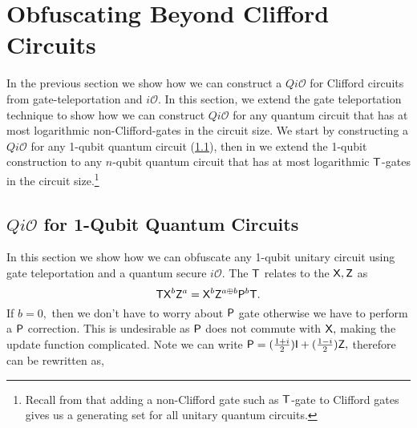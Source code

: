 
\section{Obfuscating Beyond Clifford Circuits}
\label{QiO:Clifford+T:family}
In the previous section we show how we can construct a $Qi\mathcal{O}$ for Clifford circuits from gate-teleportation and $i\mathcal{O}.$ In this section, we extend the gate teleportation technique to show how we can construct $Qi\mathcal{O}$ for any quantum circuit that has at most logarithmic non-Clifford-gates in the circuit size.  We start by constructing a $Qi\mathcal{O}$ for any 1-qubit quantum circuit (\cref{QiO:Clifford+T:family+GT}), then in   we extend the 1-qubit construction to any $n$-qubit quantum circuit that has at most logarithmic  ${\sf T}$-gates in the circuit size.\footnote{Recall from   that adding a non-Clifford gate  such as ${\sf T}$-gate to Clifford gates gives us a generating set for all unitary quantum circuits.}



\subsection{$Qi\mathcal{O}$ for 1-Qubit Quantum Circuits}
\label{QiO:Clifford+T:family+GT}
In this section we show how we can obfuscate any 1-qubit unitary circuit using gate teleportation and a quantum secure $i\mathcal{O}.$  The ${\sf T}$ relates to the ${\sf X}, {\sf Z}$ as
\begin{equation}
\label{eq:pgate}
{\sf T} {\sf X}^b {\sf Z}^a={\sf X}^b {\sf Z}^{a\oplus b}{\sf P}^b {\sf T}.
\end{equation}
If $b=0,$ then we don't have to worry about ${\sf P}$ gate otherwise we have to perform a ${\sf P}$ correction. This is undesirable as ${\sf P}$ does not commute with ${\sf X},$ making the update function complicated. Note we can write ${\sf P}=(\frac{1+i}{2}) {\sf I} + (\frac{1-i}{2}){\sf Z},$ therefore   can be rewritten as,

